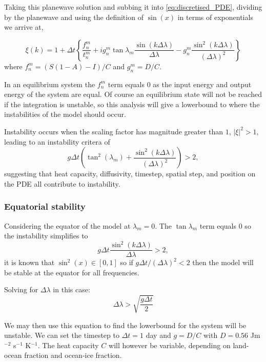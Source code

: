 \documentclass[12pt, onecolumn]{revtex4-2}    %
\begin{document}
Taking this planewave solution and subbing it into \eqref{eq:discretised_PDE}, dividing by the planewave and using the definition of $\sin(x)$ in terms of exponentials we arrive at,

\begin{equation}
    \xi(k) = 1 + \Delta t \left\{\frac{f^m_n}{t^m_n} + i g^m_n \tan\lambda_m \frac{\sin(k\Delta\lambda)}{\Delta\lambda} - g^m_n\frac{\sin^2(k\Delta\lambda)}{(\Delta\lambda)^2}\right\}
\end{equation}
where $f^m_n = (S(1-A) - I) / C$ and $g^m_n = D / C$.

In an equilibrium system the $f^m_n$ term equals $0$ as the input energy and output energy of the system are equal.
Of course an equilibrium state will not be reached if the integration is unstable, so this analysis will give a lowerbound to where the instabilities of the model should occur.

Instability occurs when the scaling factor has magnitude greater than $1$, $| \xi |^2 > 1$, leading to an instability critera of
\begin{equation}
    g \Delta t \left( \tan^2(\lambda_m) + \frac{\sin^2(k\Delta\lambda)}{(\Delta\lambda)^2}\right) > 2,
\end{equation}
suggesting that heat capacity, diffusivity, timestep, spatial step, and position on the PDE all contribute to instability.

\subsubsection*{Equatorial stability}

Considering the equator of the model at $\lambda_m=0$. The $\tan\lambda_m$ term equals $0$ so the instability simplifies to
\begin{equation}
    g \Delta t \frac{\sin^2(k\Delta \lambda)}{\Delta\lambda} > 2,
\end{equation}
it is known that $\sin^2(x) \in [0, 1]$ so if $g \Delta t / (\Delta\lambda)^2 < 2$ then the model will be stable at the equator for all frequencies.

Solving for $\Delta \lambda$ in this case:
\begin{equation}
    \Delta\lambda > \sqrt{\frac{g \Delta t}{2}}
\end{equation}

We may then use this equation to find the lowerbound for the system will be unstable.
We can set the timestep to $\Delta t = 1$ day and $g = D / C$ with $D = 0.56$ Jm$^{-2}$ s$^{-1}$ K$^{-1}$.
The heat capacity $C$ will however be variable, depending on land-ocean fraction and ocean-ice fraction.
\end{document}
